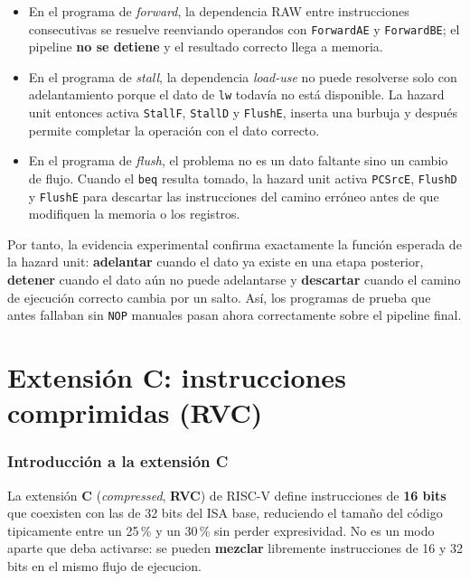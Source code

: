 \documentclass[11pt,a4paper]{article}
\begin{document}
\begin{itemize}
	\item En el programa de \textit{forward}, la dependencia RAW entre instrucciones
	      consecutivas se resuelve reenviando operandos con \texttt{ForwardAE} y
	      \texttt{ForwardBE}; el pipeline \textbf{no se detiene} y el resultado correcto
	      llega a memoria.
	\item En el programa de \textit{stall}, la dependencia \textit{load-use} no puede
	      resolverse solo con adelantamiento porque el dato de \texttt{lw} todavía no está
	      disponible. La hazard unit entonces activa \texttt{StallF}, \texttt{StallD} y
	      \texttt{FlushE}, inserta una burbuja y después permite completar la operación con
	      el dato correcto.
	\item En el programa de \textit{flush}, el problema no es un dato faltante sino un
	      cambio de flujo. Cuando el \texttt{beq} resulta tomado, la hazard unit activa
	      \texttt{PCSrcE}, \texttt{FlushD} y \texttt{FlushE} para descartar las
	      instrucciones del camino erróneo antes de que modifiquen la memoria o los
	      registros.
\end{itemize}

Por tanto, la evidencia experimental confirma exactamente la función esperada de la
hazard unit: \textbf{adelantar} cuando el dato ya existe en una etapa posterior,
\textbf{detener} cuando el dato aún no puede adelantarse y \textbf{descartar} cuando el
camino de ejecución correcto cambia por un salto. Así, los programas de prueba que antes
fallaban sin \texttt{NOP} manuales pasan ahora correctamente sobre el pipeline final.

\part{Extensión C: instrucciones comprimidas (RVC)}

\section{Introducción a la extensión C}

La extensión \textbf{C} (\textit{compressed}, \textbf{RVC}) de RISC-V define
instrucciones de \textbf{16 bits} que coexisten con las de 32 bits del ISA base,
reduciendo el tamaño del código tipicamente entre un 25\,\% y un 30\,\% sin perder
expresividad. No es un modo aparte que deba activarse: se pueden \textbf{mezclar}
libremente instrucciones de 16 y 32 bits en el mismo flujo de ejecucion.
\end{document}
